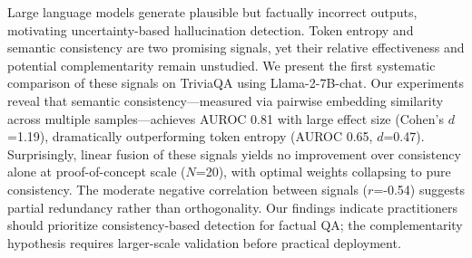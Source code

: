 Large language models generate plausible but factually incorrect outputs, motivating uncertainty-based hallucination detection. Token entropy and semantic consistency are two promising signals, yet their relative effectiveness and potential complementarity remain unstudied. We present the first systematic comparison of these signals on TriviaQA using Llama-2-7B-chat. Our experiments reveal that semantic consistency---measured via pairwise embedding similarity across multiple samples---achieves AUROC 0.81 with large effect size (Cohen's $d$=1.19), dramatically outperforming token entropy (AUROC 0.65, $d$=0.47). Surprisingly, linear fusion of these signals yields no improvement over consistency alone at proof-of-concept scale ($N$=20), with optimal weights collapsing to pure consistency. The moderate negative correlation between signals ($r$=-0.54) suggests partial redundancy rather than orthogonality. Our findings indicate practitioners should prioritize consistency-based detection for factual QA; the complementarity hypothesis requires larger-scale validation before practical deployment.
